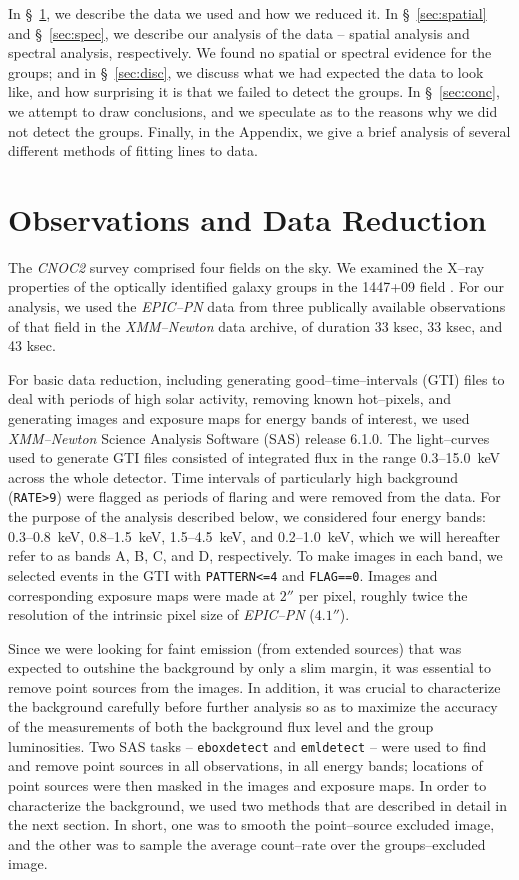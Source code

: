 \documentclass[12pt,preprint]{aastex}
\begin{document}
In \S~\ref{sec:obs}, we describe the data we used and how we reduced it.  In
\S~\ref{sec:spatial} and \S~\ref{sec:spec}, we describe our analysis of the
data -- spatial analysis and spectral analysis, respectively.
We found no
spatial or spectral evidence for the groups; and in \S~\ref{sec:disc}, we
discuss what we had expected the data to look like, and how surprising it is
that we failed to detect the groups.  In \S~\ref{sec:conc}, we attempt to draw
conclusions, and we speculate as to the reasons why we did not detect the
groups.  Finally, in the Appendix, we give a brief analysis of several
different methods of fitting lines to data.


\section{Observations and Data Reduction}
\label{sec:obs}
The \textsl{CNOC2} survey comprised four fields on the sky.  We examined
the X--ray properties of the optically identified galaxy groups in the
1447+09 field \citep{carlberg2001eg, carlberg2001gg}.
For our analysis, we used the \textsl{EPIC--PN} data from
three publically available observations of that field in the
\textsl{XMM--Newton} data archive, of duration 33 ksec, 33 ksec, and 43 ksec. 

For basic data reduction, including generating good--time--intervals (GTI)
files to deal with periods of high solar activity, removing known
hot--pixels, and generating images and exposure maps for energy bands of
interest, we used \textsl{XMM--Newton} Science Analysis Software (SAS)
release 6.1.0.  The light--curves used to generate GTI files consisted of
integrated flux in the range 0.3--15.0~keV across the whole detector.  Time
intervals of particularly high background ({\tt RATE>9}) were flagged as periods
of flaring and were removed from the data.  For the purpose of the
analysis described below, we considered four energy bands:
0.3--0.8~keV, 0.8--1.5~keV, 1.5--4.5~keV, and 0.2--1.0~keV, which we will
hereafter refer to as bands A, B, C, and D, respectively.  To make
images in each band, we selected events in the GTI with {\tt PATTERN<=4} and
{\tt FLAG==0}.  Images and corresponding exposure maps were made at $2''$ per
pixel, roughly twice the resolution of the intrinsic pixel size of
\textsl{EPIC--PN} ($4.1''$). 

Since we were looking for faint emission (from extended sources) that was
expected to outshine the background by only a slim margin, it was essential to
remove point sources from the images.
In addition, it was crucial to characterize the background
carefully before further analysis so as to maximize the accuracy of the
measurements of both the background flux level and the group luminosities. 
Two SAS tasks -- {\tt eboxdetect} and {\tt emldetect} -- were used to find and
remove point sources in all observations, in all energy bands; locations of
point sources were then masked in the images and exposure maps.  In order to
characterize the background, we used two methods that are described in
detail in the next section.  In short, one was to smooth the point--source
excluded image, and the other was to sample the average count--rate over
the groups--excluded image.
\end{document}
